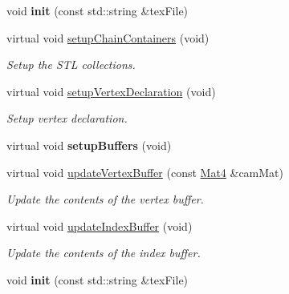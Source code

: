 \begin{DoxyCompactItemize}
\mbox{\label{classPUBillboardChain_a22aa558153aa2b69062d11639beff7f3}} 
void {\bfseries init} (const std\+::string \&tex\+File)
\item 
\mbox{\label{classPUBillboardChain_a33dd736e22fa6a837f27cbc421f76f52}} 
virtual void \hyperlink{classPUBillboardChain_a33dd736e22fa6a837f27cbc421f76f52}{setup\+Chain\+Containers} (void)
\begin{DoxyCompactList}\small\item\em Setup the S\+TL collections. \end{DoxyCompactList}\item 
\mbox{\label{classPUBillboardChain_afc75f6fc8849f34c633d3e90e20b8572}} 
virtual void \hyperlink{classPUBillboardChain_afc75f6fc8849f34c633d3e90e20b8572}{setup\+Vertex\+Declaration} (void)
\begin{DoxyCompactList}\small\item\em Setup vertex declaration. \end{DoxyCompactList}\item 
\mbox{\label{classPUBillboardChain_a7cb8563b291e406d35a5ac796f6a1505}} 
virtual void {\bfseries setup\+Buffers} (void)
\item 
\mbox{\label{classPUBillboardChain_ac49233f9a34a80d93bf6c0540811a0f7}} 
virtual void \hyperlink{classPUBillboardChain_ac49233f9a34a80d93bf6c0540811a0f7}{update\+Vertex\+Buffer} (const \hyperlink{classMat4}{Mat4} \&cam\+Mat)
\begin{DoxyCompactList}\small\item\em Update the contents of the vertex buffer. \end{DoxyCompactList}\item 
\mbox{\label{classPUBillboardChain_a46f24da7cad82cdd5d11bc26f610f2f7}} 
virtual void \hyperlink{classPUBillboardChain_a46f24da7cad82cdd5d11bc26f610f2f7}{update\+Index\+Buffer} (void)
\begin{DoxyCompactList}\small\item\em Update the contents of the index buffer. \end{DoxyCompactList}\item 
\mbox{\label{classPUBillboardChain_a22aa558153aa2b69062d11639beff7f3}} 
void {\bfseries init} (const std\+::string \&tex\+File)
\end{DoxyCompactItemize}
